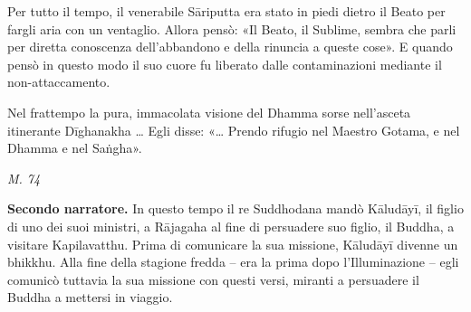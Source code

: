 Per tutto il tempo, il venerabile Sāriputta era stato in piedi dietro il
Beato per fargli aria con un ventaglio. Allora pensò: «Il Beato, il
Sublime, sembra che parli per diretta conoscenza dell’abbandono e della
rinuncia a queste cose». E quando pensò in questo modo il suo cuore fu
liberato dalle contaminazioni mediante il non-attaccamento.


Nel frattempo la pura, immacolata visione del Dhamma sorse nell’asceta
itinerante Dīghanakha …​ Egli disse: «…​ Prendo rifugio nel Maestro
Gotama, e nel Dhamma e nel Saṅgha».


\emph{M. 74}


\textbf{Secondo narratore.} In questo tempo il re Suddhodana mandò Kāludāyī, il
figlio di uno dei suoi ministri, a Rājagaha al fine di persuadere suo
figlio, il Buddha, a visitare Kapilavatthu. Prima di comunicare la sua
missione, Kāludāyī divenne un bhikkhu. Alla fine della stagione fredda –
era la prima dopo l’Illuminazione – egli comunicò tuttavia la sua
missione con questi versi, miranti a persuadere il Buddha a mettersi in
viaggio.


